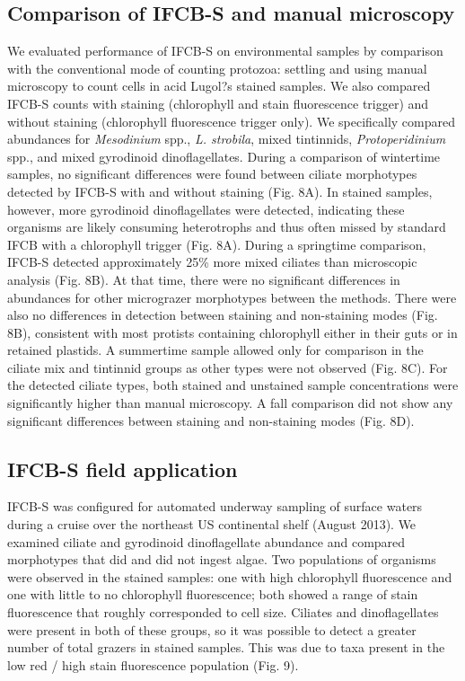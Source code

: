 \subsection{Comparison of IFCB-S and manual microscopy}
We evaluated performance of IFCB-S on environmental samples by comparison with the conventional mode of counting protozoa: settling and using manual microscopy to count cells in acid Lugol?s stained samples. We also compared IFCB-S counts with staining (chlorophyll and stain fluorescence trigger) and without staining (chlorophyll fluorescence trigger only). We specifically compared abundances for \textit{Mesodinium} spp., \textit{L. strobila}, mixed tintinnids, \textit{Protoperidinium} spp., and mixed gyrodinoid dinoflagellates. During a comparison of wintertime samples, no significant differences were found between ciliate morphotypes detected by IFCB-S with and without staining (Fig. 8A). In stained samples, however, more gyrodinoid dinoflagellates were detected, indicating these organisms are likely consuming heterotrophs and thus often missed by standard IFCB with a chlorophyll trigger (Fig. 8A). During a springtime comparison, IFCB-S detected approximately 25\% more mixed ciliates than microscopic analysis (Fig. 8B). At that time, there were no significant differences in abundances for other micrograzer morphotypes between the methods. There were also no differences in detection between staining and non-staining modes (Fig. 8B), consistent with most protists containing chlorophyll either in their guts or in retained plastids. A summertime sample allowed only for comparison in the ciliate mix and tintinnid groups as other types were not observed (Fig. 8C). For the detected ciliate types, both stained and unstained sample concentrations were significantly higher than manual microscopy. A fall comparison did not show any significant differences between staining and non-staining modes
(Fig. 8D).
 
\subsection {IFCB-S field application}
IFCB-S was configured for automated underway sampling of surface waters during a cruise over the northeast US continental shelf (August 2013). We examined ciliate and gyrodinoid dinoflagellate abundance and compared morphotypes that did and did not ingest algae. Two populations of organisms were observed in the stained samples: one with high chlorophyll fluorescence and one with little to no chlorophyll fluorescence; both showed a range of stain fluorescence that roughly corresponded to cell size. Ciliates and dinoflagellates were present in
both of these groups, so it was possible to detect a greater number of total grazers in stained samples. This was due to taxa present in the low red / high stain fluorescence population (Fig. 9).

